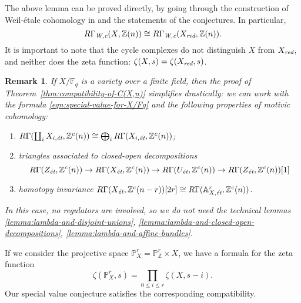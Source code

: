 \documentclass[10pt,a4paper,oneside]{article}
\newcommand{\FF}{\mathbb{F}}
\newcommand{\ZZ}{\mathbb{Z}}
\renewcommand{\AA}{\mathbb{A}}
\newcommand{\PP}{\mathbb{P}}
\newcommand{\et}{\text{\it \'{e}t}}
\newcommand{\red}{\text{\it red}}
\newcommand{\Wc}{\text{\it W,c}}
\theoremstyle{myplain}
\theoremstyle{mydefinition}
\newtheorem{remark}[theorem]{Remark}
\numberwithin{equation}{section}
\begin{document}
The above lemma can be proved directly, by going through the construction of
Weil-\'{e}tale cohomology in \cite{Beshenov-Weil-etale-1} and the statements of
the conjectures. In particular,
$$R\Gamma_\Wc (X, \ZZ(n)) \cong R\Gamma_\Wc (X_\red, \ZZ(n)).$$
It is important to note that the cycle complexes do not distinguish $X$ from
$X_\red$, and neither does the zeta function: $\zeta (X,s) = \zeta (X_\red,s)$.

\begin{remark}
  If $X/\FF_q$ is a variety over a finite field, then the proof of
  Theorem~\ref{thm:compatibility-of-C(X,n)} simplifies drastically: we can work
  with the formula \eqref{eqn:special-value-for-X/Fq} and the following
  properties of motivic cohomology:
  \begin{enumerate}
  \item[1)] $R\Gamma (\coprod_i X_{i,\et}, \ZZ^c (n)) \cong
    \bigoplus_i R\Gamma (X_{i,\et}, \ZZ^c (n))$;

  \item[2)] triangles associated to closed-open decompositions
    \[ R\Gamma (Z_\et, \ZZ^c (n)) \to
      R\Gamma (X_\et, \ZZ^c (n)) \to
      R\Gamma (U_\et, \ZZ^c (n)) \to
      R\Gamma (Z_\et, \ZZ^c (n))[1] \]

  \item[3)] homotopy invariance
    $R\Gamma (X_\et, \ZZ^c (n-r)) [2r] \cong
    R\Gamma (\AA^r_{X,\et}, \ZZ^c (n))$.
  \end{enumerate}
  In this case, no regulators are involved, so we do not need the technical
  lemmas \ref{lemma:lambda-and-disjoint-unions},
  \ref{lemma:lambda-and-closed-open-decompositions},
  \ref{lemma:lambda-and-affine-bundles}.
\end{remark}

If we consider the projective space $\PP_X^r = \PP_\ZZ^r \times X$, we have a
formula for the zeta function
\begin{equation}
  \label{eqn:zeta-function-for-projective-space}
  \zeta (\PP_X^r, s) = \prod_{0 \le i \le r} \zeta (X, s-i).
\end{equation}
Our special value conjecture satisfies the corresponding compatibility.
\end{document}
